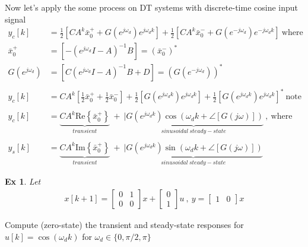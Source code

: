\documentclass[twoside]{article}
\newtheorem{exmp}[theorem]{Ex}
\begin{document}
Now let's apply the some process on DT systems with discrete-time cosine input signal
%
\begin{align*}
   y_c[k] &= \frac{1}{2} \left[ C A^k \bar{x}_0^+ + G(e^{j \omega_d}) e^{j \omega_d k} \right] + \frac{1}{2} \left[ C A^k \bar{x}_0^- + G(e^{-j \omega_d}) e^{-j \omega_d k}  \right] \ \mathrm{where} \ 
   \\
   \bar{x}_0^+ &= \left[ - (e^{j \omega_d } I - A)^{-1} B \right]  = \left(  \bar{x}_0^- \right)^* 
   \\
   G(e^{j \omega_d }) &= \left[ C (e^{j \omega_d } I - A)^{-1} B + D \right] = \left( G(e^{-j \omega_d }) \right)^*
   \\
   \\
   y_c[k] &= C A^k \left[ \frac{1}{2} \bar{x}_0^+ + \frac{1}{2} \bar{x}_0^- \right] +
   \frac{1}{2} \left[ G(e^{j \omega_d k}) e^{j \omega_d k} \right] + \frac{1}{2} \left[G(e^{j \omega_d k}) e^{j \omega_d k}  \right]^* \ \mathrm{note} 
   \\
   \\
   y_c[k] &=  \underbrace{C A^k \mathrm{Re}\left\lbrace \bar{x}_0^+ \right\rbrace}_{transient}  \ +  \  \underbrace{| G(e^{j \omega_d k}) \cos \left( \omega_d k + \angle [G(j \omega)] \right)}_{sinusoidal \ steady-state} \ , \ \mathrm{where}
   \\
   \\
   y_s[k] &=  \underbrace{C A^k \mathrm{Im}\left\lbrace \bar{x}_0^+ \right\rbrace}_{transient}  \ +  \  \underbrace{| G(e^{j \omega_d k}) \sin \left( \omega_d k + \angle [G(j \omega)] \right)}_{sinusoidal \ steady-state}
\end{align*}

\begin{exmp}
Let
\begin{align*} 
x[k+1] = \begin{bmatrix} 0 & 1 \\ 0 & 0 \end{bmatrix} x + \begin{bmatrix} 0 \\ 1 \end{bmatrix} u \ , \ y = \begin{bmatrix} 1 & 0 \end{bmatrix} x 
\end{align*}
\end{exmp}
%
Compute (zero-state) the transient and steady-state responses for $u[k] = \cos (\omega_d k)$ for $\omega_d \in \lbrace 0 , \pi / 2  , \pi \rbrace$
\end{document}
